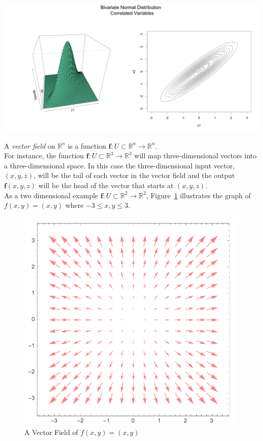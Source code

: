 \documentclass[12pt]{article}
\begin{document}
\indent\includegraphics[scale=0.2]{bivariate_corr_3d.png}

 A \emph{vector field} on $\mathbb{R}^n$ is a function $\mathbf{f}:U\subset\mathbb{R}^n\rightarrow\mathbb{R}^n$. \\

 For instance, the function $\mathbf{f}:U\subset\mathbb{R}^3\rightarrow\mathbb{R}^3$ will map three-dimensional vectors into a three-dimensional space. In this case the three-dimensional input vector, $(x,y,z)$, will be the tail of each vector in the vector field and the output $\mathbf{f}(x,y,z)$ will be the head of the vector that starts at $(x,y,z)$. \\

 As a two dimensional example $\mathbf{f}:U\subset\mathbb{R}^2\rightarrow\mathbb{R}^2$, Figure~\ref{fig:vectorfield} illustrates the graph of $f(x,y) = (x,y)$ where $-3\leq x,y\leq3$.

\begin{figure}[h!]
\centering
\caption{A Vector Field of $f(x,y) = (x,y)$}
\label{fig:vectorfield}
\indent\includegraphics[scale=0.7]{vectorfield.png}
\end{figure}
\end{document}
